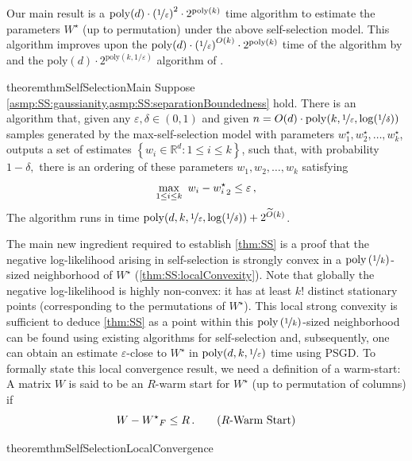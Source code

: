 \documentclass[11pt,letterpaper]{article}
\theoremstyle{plain}
\theoremstyle{definition}
\theoremstyle{remark}
\newcommand{\inbrace}[1]{\ensuremath{\left\{#1\right\}}}
\newcommand{\inparen}[1]{\ensuremath{\left(#1\right)}}
\let\norm\relax
\newcommand{\norm}[1]{\ensuremath{\left\lVert #1 \right\rVert}}
\newcommand{\R}{\mathbb{R}}
\newcommand{\nfrac}[2]{\nicefrac{#1}{#2}}
\newcommand{\poly}{\mathrm{poly}}
\newcommand{\eps}{\varepsilon}
\newcommand{\wt}[1]{\widetilde{#1}}
\newcommand{\Wstar}{{W^\star}}
\begin{document}
{        Our main result is a $\poly(d)\cdot \inparen{\nfrac{1}{\eps}}^2 \cdot 2^{\poly(k)}$ time algorithm to estimate the parameters $W^\star$ (up to permutation) under the above self-selection model. This algorithm improves upon the ${\poly(d)\cdot \inparen{\nfrac{1}{\eps}}^{O(k)} \cdot 2^{\poly(k)}}$ time of the algorithm by \cite{gaitonde2024selfselection} and the $\poly(d)\cdot 2^{\poly(k, {1}/{\eps})}$ algorithm of \cite{cherapanamjeri2023selfselection}.
        \begin{restatable}{theorem}{thmSelfSelectionMain}\label{thm:SS}
            Suppose \cref{asmp:SS:gaussianity,asmp:SS:separationBoundedness} hold.
            There is an algorithm that, 
                given any $\eps,\delta\in (0,1)$ 
                and 
                given {$n=O(d) \cdot \poly(k,\nfrac{1}{\eps}, \log(\nicefrac1\delta))$} samples generated by the max-self-selection model with parameters $w^\star_1,w^\star_2,\dots,w^\star_k$,
            outputs a set of estimates $\inbrace{w_i\in \R^d\colon 1\leq i\leq k}$,
            such that, 
            with probability $1-\delta,$
            there is an ordering of these parameters $w_1,w_2,\dots,w_k$ satisfying 
            \[
                \max_{1\leq i\leq k}~\norm{w_i - w^\star_i}_2 \leq \eps\,,
            \]
            The algorithm runs in time \mbox{$\poly(d,k,\nfrac{1}{\eps},{\log(\nicefrac1\delta)}) + {2^{\wt{O}(k)}}$}.
        \end{restatable}
        The main new ingredient required to establish \cref{thm:SS} is a proof that the negative log-likelihood arising in self-selection is strongly convex in a $\poly\inparen{\nfrac{1}{k}}$-sized neighborhood of $\Wstar$ (\cref{thm:SS:localConvexity}).
        Note that globally the negative log-likelihood is highly non-convex: it has at least $k!$ distinct stationary points (corresponding to the permutations of $\Wstar$).
        This local strong convexity is sufficient to deduce \cref{thm:SS} as a point within this $\poly\inparen{\nfrac{1}{k}}$-sized neighborhood can be found using existing algorithms for self-selection and, subsequently, one can obtain an estimate $\eps$-close to $\Wstar$ in $\poly(d,k,\nfrac{1}{\eps})$ time using PSGD.
        To formally state this local convergence result, we need a definition of a warm-start:
        A matrix $W$ is said to be an $R$-warm start for $\Wstar$ (up to permutation of columns) if 
        \[
            \norm{W-W^\star}_F\leq R\,.
            \tag{$R$-Warm Start}
        \]
        \begin{restatable}{theorem}{thmSelfSelectionLocalConvergence}\label{thm:SS:localConvergence}

\end{restatable}}
\end{document}
